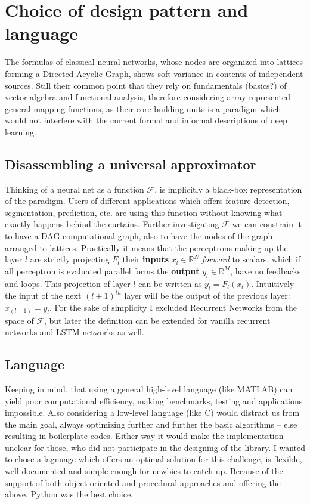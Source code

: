 \section{Choice of design pattern and language}

The formulas of classical neural networks, whose nodes are organized into lattices forming a Directed Acyclic Graph, shows soft variance in contents of independent sources. Still their common point that they rely on fundamentals (basics?) of vector algebra and functional analysis, therefore considering array represented general mapping functions, as their core building units is a paradigm which would not interfere with the current formal and informal descriptions of deep learning.

\subsection{Disassembling a universal approximator}
Thinking of a neural net as a function \(\mathcal{F}\), is implicitly a black-box representation of the paradigm.
Users of different applications which offers feature detection, segmentation, prediction, etc. are using this function without knowing what exactly happens behind the curtains. 
Further investigating \(\mathcal{F}\) we can constrain it to have a DAG computational graph, also to have the nodes of the graph arranged to lattices.
Practically it means that the perceptrons making up the layer \(l\) are strictly projecting $F_l$ their \textbf{inputs} 
$ x_l \in \mathbb{R}^N $ \emph{forward} to scalars, which if all perceptron is evaluated parallel forms the 
\textbf{output} $y_l \in \mathbb{R}^M$, have no feedbacks and loops. 
This projection of layer $l$ can be written as $y_l = F_l(x_l)$. 
Intuitively the input of the next $(l+1)^{th}$ layer will be the output of the previous layer:
$x_{(l+1)} = y_l$.
For the sake of simplicity I excluded Recurrent Networks from the space of $\mathcal{F}$, but later the definition can be extended for vanilla recurrent networks and LSTM networks as well.

\subsection{Language} Keeping in mind, that using a general high-level language (like MATLAB) can yield poor computational efficiency, making benchmarks, testing and applications impossible.
Also considering a low-level language (like C) would distract us from the main goal, always optimizing further and further the basic algorithms -- else resulting in boilerplate codes. Either way it would make the implementation unclear for those, who did not participate in the designing of the library.
I wanted to chose a lagnuage which offers an optimal solution for this challenge, is flexible, well documented and simple enough for newbies to catch up.
Because of the support of both object-oriented and procedural approaches and offering the above, Python was the best choice.


